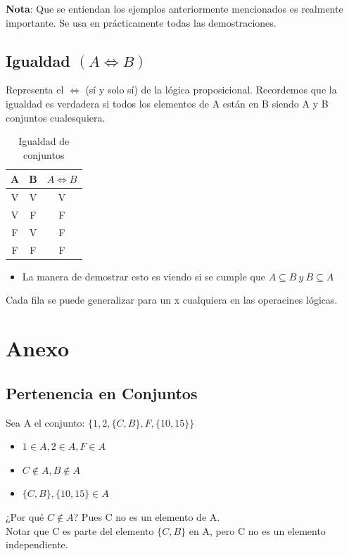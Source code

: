 \documentclass[10pt,a4paper]{article}
\begin{document}
\textbf{Nota}: Que se entiendan los ejemplos anteriormente mencionados es realmente importante. Se usa en prácticamente todas las demostraciones.\subsection*{Igualdad $(A \iff B)$}
Representa el $\iff$ (sí y solo sí) de la lógica proposicional. Recordemos que la igualdad es verdadera si todos los elementos de A están en B siendo A y B conjuntos cualesquiera. \\
\begin{table}[h!]
    \centering
    \begin{tabular}{|c | c | c|}
    \hline
    \textbf{A} & \textbf{B} & \textbf{$A \iff B$} \\[0.1cm]
    \hline
    V & V & V \\
    V & F & F \\
    F & V & F \\
    F & F & F \\
    \hline
    \end{tabular}
    \caption{Igualdad de conjuntos}
\end{table} 
\begin{itemize}
    \item La manera de demostrar esto es viendo si se cumple que $A \subseteq B \ y \ B \subseteq A$
\end{itemize}
Cada fila se puede generalizar para un x cualquiera en las operacines lógicas. 
\section*{Anexo}
\subsection*{Pertenencia en Conjuntos}
\label{subsec:pertenecencia_conjuntos}
Sea A el conjunto: $\{1, 2, \{C, B\}, F, \{10, 15\}\}$
\begin{itemize}
    \item $ 1 \in A, 2 \in A, F \in A $
    \item $ C \notin A, B \notin A $
    \item $  \{C, B\}, \{10, 15\} \in A $
\end{itemize}
¿Por qué $C \notin A$? Pues C no es un elemento de A.\\ Notar que C es parte del elemento $\{C, B\}$ en A, pero C no es un elemento independiente.
\end{document}

